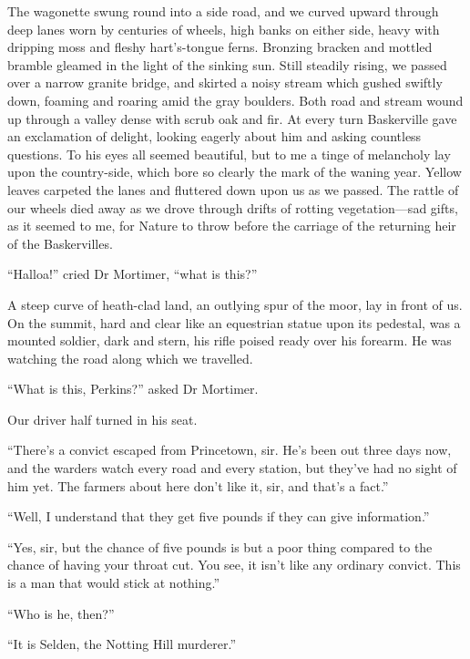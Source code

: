 \documentclass[paper=5.5in:8.5in,BCOR=7mm,twoside,DIV=calc,12pt,usegeometry,openany,chapterprefix,endperiod,headings=big]{scrbook} %
\begin{document}
The wagonette swung round into a side road, and we curved upward through deep lanes worn by centuries of wheels, high banks on either side, heavy with dripping moss and fleshy hart's-tongue ferns. Bronzing bracken and mottled bramble gleamed in the light of the sinking sun. Still steadily rising, we passed over a narrow granite bridge, and skirted a noisy stream which gushed swiftly down, foaming and roaring amid the gray boulders. Both road and stream wound up through a valley dense with scrub oak and fir. At every turn Baskerville gave an exclamation of delight, looking eagerly about him and asking countless questions. To his eyes all seemed beautiful, but to me a tinge of melancholy lay upon the country-side, which bore so clearly the mark of the waning year. Yellow leaves carpeted the lanes and fluttered down upon us as we passed. The rattle of our wheels died away as we drove through drifts of rotting vegetation---sad gifts, as it seemed to me, for Nature to throw before the carriage of the returning heir of the Baskervilles.

\enquote{Halloa!} cried Dr Mortimer, \enquote{what is this?}

A steep curve of heath-clad land, an outlying spur of the moor, lay in front of us. On the summit, hard and clear like an equestrian statue upon its pedestal, was a mounted soldier, dark and stern, his rifle poised ready over his forearm. He was watching the road along which we travelled.

\enquote{What is this, Perkins?} asked Dr Mortimer.

Our driver half turned in his seat.

\enquote{There's a convict escaped from Princetown, sir. He's been out three days now, and the warders watch every road and every station, but they've had no sight of him yet. The farmers about here don't like it, sir, and that's a fact.}

\enquote{Well, I understand that they get five pounds if they can give information.}

\enquote{Yes, sir, but the chance of five pounds is but a poor thing compared to the chance of having your throat cut. You see, it isn't like any ordinary convict. This is a man that would stick at nothing.}

\enquote{Who is he, then?}

\enquote{It is Selden, the Notting Hill murderer.}
\end{document}
